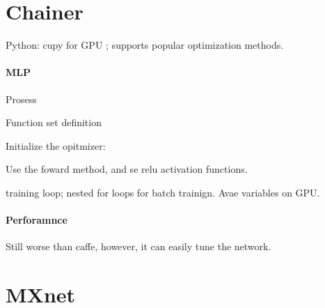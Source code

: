 \documentclass[12pt]{article}
\begin{document}
\section{Chainer}
Python: cupy for GPU ; supports popular optimization methods.

\paragraph{MLP} Prosess

Function set definition

Initialize the opitmizer:

Use the foward method, and se relu activation functions.

training loop; nested for loops for batch trainign. Avae variables on GPU.

\paragraph{Perforamnce}
Still worse than caffe, however, it can easily tune the network.

\section{MXnet}
\end{document}
